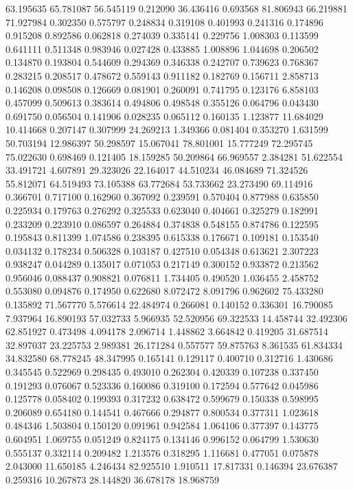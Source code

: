 63.195635
65.781087
56.545119
0.212090
36.436416
0.693568
81.806943
66.219881
71.927984
0.302350
0.575797
0.248834
0.319108
0.401993
0.241316
0.174896
0.915208
0.892586
0.062818
0.274039
0.335141
0.229756
1.008303
0.113599
0.641111
0.511348
0.983946
0.027428
0.433885
1.008896
1.044698
0.206502
0.134870
0.193804
0.544609
0.294369
0.346338
0.242707
0.739623
0.768367
0.283215
0.208517
0.478672
0.559143
0.911182
0.182769
0.156711
2.858713
0.146208
0.098508
0.126669
0.081901
0.260091
0.741795
0.123176
6.858103
0.457099
0.509613
0.383614
0.494806
0.498548
0.355126
0.064796
0.043430
0.691750
0.056504
0.141906
0.028235
0.065112
0.160135
1.123877
11.684029
10.414668
0.207147
0.307999
24.269213
1.349366
0.081404
0.353270
1.631599
50.703194
12.986397
50.298597
15.067041
78.801001
15.777249
72.295745
75.022630
0.698469
0.121405
18.159285
50.209864
66.969557
2.384281
51.622554
33.491721
4.607891
29.323026
22.164017
44.510234
46.084689
71.324526
55.812071
64.519493
73.105388
63.772684
53.733662
23.273490
69.114916
0.366701
0.717100
0.162960
0.367092
0.239591
0.570404
0.877988
0.635850
0.225934
0.179763
0.276292
0.325533
0.623040
0.404661
0.325279
0.182991
0.233209
0.223910
0.086597
0.264884
0.374838
0.548155
0.874786
0.122595
0.195843
0.811399
1.074586
0.238395
0.615338
0.176671
0.109181
0.153540
0.034132
0.178234
0.506328
0.103187
0.427510
0.054348
0.613621
2.307223
0.938247
0.044289
0.135017
0.071053
0.217149
0.300152
0.933872
0.213562
0.956046
0.088437
0.908821
0.076811
1.734405
0.490520
1.036455
2.458752
0.553080
0.094876
0.174950
0.622680
8.072472
8.091796
0.962602
75.433280
0.135892
71.567770
5.576614
22.484974
0.266081
0.140152
0.336301
16.790085
7.937964
16.890193
57.032733
5.966935
52.520956
69.322533
14.458744
32.492306
62.851927
0.473498
4.094178
2.096714
1.448862
3.664842
0.419205
31.687514
32.897037
23.225753
2.989381
26.171284
0.557577
59.875763
8.361535
61.834334
34.832580
68.778245
48.347995
0.165141
0.129117
0.400710
0.312716
1.430686
0.345545
0.522969
0.298435
0.493010
0.262304
0.420339
0.107238
0.337450
0.191293
0.076067
0.523336
0.160086
0.319100
0.172594
0.577642
0.045986
0.125778
0.058402
0.199393
0.317232
0.638472
0.599679
0.150338
0.598995
0.206089
0.654180
0.144541
0.467666
0.294877
0.800534
0.377311
1.023618
0.484346
1.503804
0.150120
0.091961
0.942584
1.064106
0.377397
0.143775
0.604951
1.069755
0.051249
0.824175
0.134146
0.996152
0.064799
1.530630
0.555137
0.332114
0.209482
1.213576
0.318295
1.116681
0.477051
0.075878
2.043000
11.650185
4.246434
82.925510
1.910511
17.817331
0.146394
23.676387
0.259316
10.267873
28.144820
36.678178
18.968759
